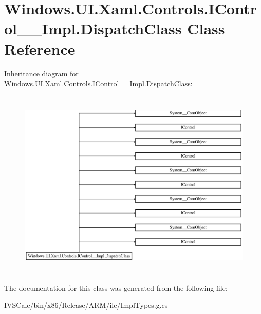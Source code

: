 \hypertarget{class_windows_1_1_u_i_1_1_xaml_1_1_controls_1_1_i_control_____impl_1_1_dispatch_class}{}\section{Windows.\+U\+I.\+Xaml.\+Controls.\+I\+Control\+\_\+\+\_\+\+Impl.\+Dispatch\+Class Class Reference}
\label{class_windows_1_1_u_i_1_1_xaml_1_1_controls_1_1_i_control_____impl_1_1_dispatch_class}
Inheritance diagram for Windows.\+U\+I.\+Xaml.\+Controls.\+I\+Control\+\_\+\+\_\+\+Impl.\+Dispatch\+Class\+:\begin{figure}[H]
\begin{center}
\leavevmode
\includegraphics[height=9.166667cm]{class_windows_1_1_u_i_1_1_xaml_1_1_controls_1_1_i_control_____impl_1_1_dispatch_class}
\end{center}
\end{figure}


The documentation for this class was generated from the following file\+:\begin{DoxyCompactItemize}
\item 
I\+V\+S\+Calc/bin/x86/\+Release/\+A\+R\+M/ilc/Impl\+Types.\+g.\+cs\end{DoxyCompactItemize}
